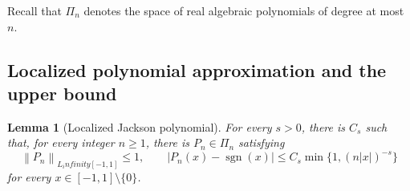 \documentclass[11pt]{article}
\def\infty{infinity}%
\newtheorem{lemma}[theorem]{Lemma}
\newcommand{\sgn}{\operatorname{sgn}}
\newcommand{\norm}[1]{\left\lVert#1\right\rVert}
\newcommand\eed[1]{{\color{green!45!black} #1}}
\begin{document}
\eed{Recall that $\Pi_n$ denotes the space of real algebraic polynomials of degree at most $n$.}

\subsection{Localized polynomial approximation and the upper bound}

\begin{lemma}[Localized Jackson polynomial]
\label{lem:jackson}
For every $s>0$, there is $C_s$ such that, for every integer $n\ge1$, there is $P_n\in\Pi_n$ satisfying
\begin{equation}
\label{eq:jackson-bound-paper}
\norm{P_n}_{L_\infty[-1,1]}\le1,
\qquad
|P_n(x)-\sgn(x)|
\le
C_s\min\{1,(n|x|)^{-s}\}
\end{equation}
\eed{for every $x\in[-1,1]\setminus\{0\}$.}
\end{lemma}
\end{document}
